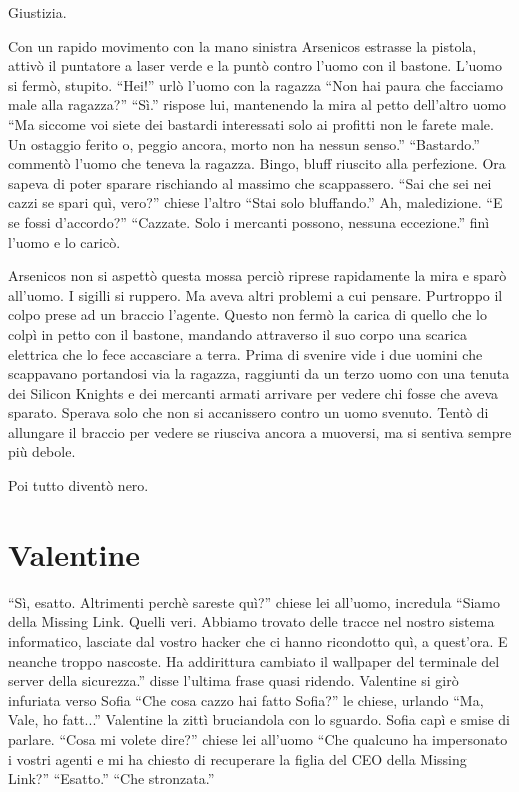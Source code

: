     Giustizia.

    Con un rapido movimento con la mano sinistra Arsenicos estrasse la pistola, attivò il puntatore a laser verde e la
    puntò contro l'uomo con il bastone. L'uomo si fermò, stupito. ``Hei!'' urlò l'uomo con la ragazza ``Non hai paura
    che facciamo male alla ragazza?'' ``Sì.'' rispose lui, mantenendo la mira al petto dell'altro uomo ``Ma siccome voi
    siete dei bastardi interessati solo ai profitti non le farete male. Un ostaggio ferito o, peggio ancora, morto non
    ha nessun senso.'' ``Bastardo.'' commentò l'uomo che teneva la ragazza. Bingo, bluff riuscito alla perfezione. Ora
    sapeva di poter sparare rischiando al massimo che scappassero. ``Sai che sei nei cazzi se spari quì, vero?'' chiese
    l'altro ``Stai solo bluffando.'' Ah, maledizione. ``E se fossi d'accordo?'' ``Cazzate. Solo i mercanti possono,
    nessuna eccezione.'' finì l'uomo e lo caricò.

    Arsenicos non si aspettò questa mossa perciò riprese rapidamente la mira e sparò all'uomo. I sigilli si ruppero. Ma
    aveva altri problemi a cui pensare. Purtroppo il colpo
    prese ad un braccio l'agente. Questo non fermò la carica di quello che lo colpì in petto con il bastone, mandando attraverso
    il suo corpo una scarica elettrica che lo fece accasciare a terra. Prima di svenire vide i due uomini che scappavano
    portandosi via la ragazza, raggiunti da un terzo uomo con una tenuta dei Silicon Knights e dei mercanti armati arrivare per vedere chi fosse che aveva sparato. Sperava solo che
    non si accanissero contro un uomo svenuto. Tentò di allungare il braccio per vedere se riusciva ancora a muoversi,
    ma si sentiva sempre più debole.

    Poi tutto diventò nero.

  \section*{Valentine}

    ``Sì, esatto. Altrimenti perchè sareste quì?'' chiese lei all'uomo, incredula ``Siamo della Missing Link. Quelli
    veri. Abbiamo trovato delle tracce nel
    nostro sistema informatico, lasciate dal vostro hacker che ci hanno ricondotto quì, a quest'ora. E neanche troppo
    nascoste. Ha addirittura cambiato il wallpaper del terminale del server della sicurezza.'' disse l'ultima frase
    quasi ridendo. Valentine si girò infuriata verso Sofia ``Che cosa cazzo hai fatto Sofia?'' le chiese, urlando ``Ma,
    Vale, ho fatt...'' Valentine la zittì bruciandola con lo sguardo. Sofia capì e smise di parlare. ``Cosa mi volete
    dire?'' chiese lei all'uomo ``Che qualcuno ha impersonato i vostri agenti e mi ha chiesto di recuperare la figlia
    del CEO della Missing Link?'' ``Esatto.'' ``Che stronzata.''


